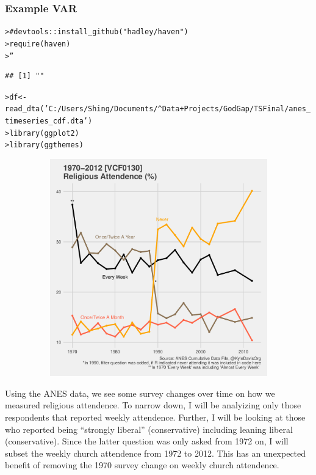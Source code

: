 \documentclass[12pt]{article}\usepackage[]{graphicx}\usepackage[]{color}
\makeatletter
\newcommand{\hlstr}[1]{\textcolor[rgb]{0.82,0.78,0.62}{#1}}%
\newcommand{\hlcom}[1]{\textcolor[rgb]{0.404,0.408,0.42}{#1}}%
\newcommand{\hlstd}[1]{\textcolor[rgb]{0.882,0.878,0.898}{#1}}%
\newcommand{\hlkwb}[1]{\textcolor[rgb]{0.902,0.675,0.196}{#1}}%
\newcommand{\hlkwd}[1]{\textcolor[rgb]{0.733,0.388,0.812}{#1}}%
\newenvironment{kframe}{%
 \def\at@end@of@kframe{}%
 \ifinner\ifhmode%
  \def\at@end@of@kframe{\end{minipage}}%
  \begin{minipage}{\columnwidth}%
 \fi\fi%
 \def\FrameCommand##1{\hskip\@totalleftmargin \hskip-\fboxsep
 \colorbox{shadecolor}{##1}\hskip-\fboxsep
     \hskip-\linewidth \hskip-\@totalleftmargin \hskip\columnwidth}%
 \MakeFramed {\advance\hsize-\width
   \@totalleftmargin\z@ \linewidth\hsize
   \@setminipage}}%
 {\par\unskip\endMakeFramed%
 \at@end@of@kframe}
\newenvironment{knitrout}{}{} %
\makeatother
\begin{document}
\begin{flushleft}
\subsubsection{Example VAR}

\begin{knitrout}
\color{fgcolor}\begin{kframe}
\begin{alltt}
\hlstd{> }\hlcom{# devtools::install_github("hadley/haven")}
\hlstd{> }\hlkwd{require}\hlstd{(haven)}
\hlstd{> }\hlstr{''}
\end{alltt}
\begin{verbatim}
## [1] ""
\end{verbatim}
\begin{alltt}
\hlstd{> }\hlstd{df} \hlkwb{<-} \hlkwd{read_dta}\hlstd{(}\hlstr{'C:/Users/Shing/Documents/^ Data + Projects/GodGap/TS Final/anes_timeseries_cdf.dta'}\hlstd{)}
\hlstd{> }\hlkwd{library}\hlstd{(ggplot2)}
\hlstd{> }\hlkwd{library}\hlstd{(ggthemes)}
\end{alltt}
\end{kframe}
\end{knitrout}

\begin{center}
\begin{knitrout}
\color{fgcolor}
\includegraphics[width=6in,height=3.7in]{figure/desc-1} 

\end{knitrout}
\end{center}

Using the ANES data, we see some survey changes over time on how we measured religious attendence. To narrow down, I will be analyizing only those respondents that reported weekly attendence. Further, I will be looking at those who reported being ``strongly liberal'' (conservative) including leaning liberal (conservative). Since the latter question was only asked from 1972 on, I will subset the weekly church attendence from 1972 to 2012. This has an unexpected benefit of removing the 1970 survey change on weekly church attendence.


\end{flushleft}
\end{document}
